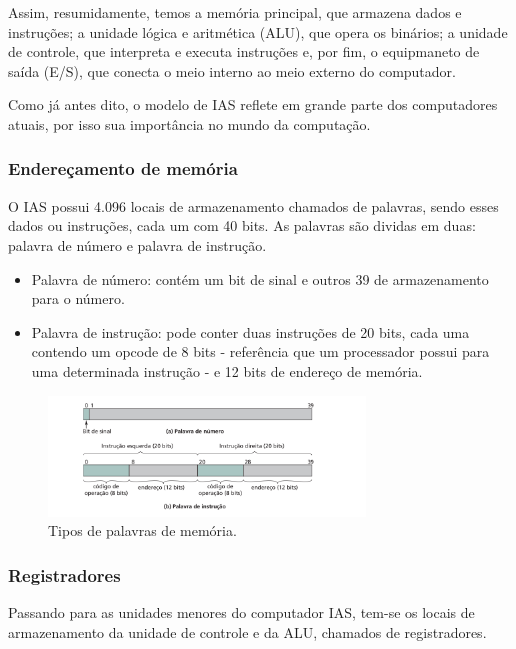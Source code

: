\documentclass{article}
\begin{document}
Assim, resumidamente, temos a memória principal, que armazena dados e
instruções; a unidade lógica e aritmética (ALU), que opera os binários; a
unidade de controle, que interpreta e executa instruções e, por fim, o
equipmaneto de saída (E/S), que conecta o meio interno ao meio externo do
computador.

Como já antes dito, o modelo de IAS reflete em grande parte dos computadores
atuais, por isso sua importância no mundo da computação.

\subsubsection{Endereçamento de memória}
O IAS possui 4.096 locais de armazenamento chamados de palavras, sendo esses
dados ou instruções, cada um com 40 bits. As palavras são dividas em duas:
palavra de número e palavra de instrução.

\begin{itemize}
        \item Palavra de número: contém um bit de sinal e outros 39 de
            armazenamento para o número. 
        \item Palavra de instrução: pode conter duas instruções de 20 bits,
            cada uma contendo um opcode de 8 bits - referência que um
            processador possui para uma determinada instrução - e 12 bits de
            endereço de memória.
\end{itemize}

\begin{figure}[H]
   \centering
   \includegraphics[width=0.75\textwidth]{palavras.png}
   \caption{Tipos de palavras de memória.}
\end{figure}

\subsubsection{Registradores}
Passando para as unidades menores do computador IAS, tem-se os locais de
armazenamento da unidade de controle e da ALU, chamados de registradores.
\end{document}
